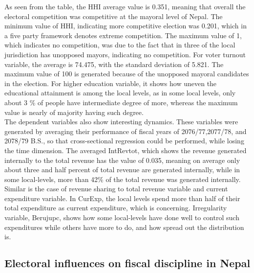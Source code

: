 As seen from the table, the HHI average value is 0.351, meaning that overall the electoral competition was competitive at the mayoral level of Nepal. The minimum value of HHI, indicating more competitive election was 0.201, which in a five party framework denotes extreme competition. The maximum value of 1, which indicates no competition, was due to the fact that in three of the local jurisdiction has unopposed mayors, indicating no competition. For voter turnout variable, the average is 74.475, with the standard deviation of 5.821. The maximum value of 100 is generated because of the unopposed mayoral candidates in the election. For higher education variable, it shows how uneven the educational attainment is among the local levels, as in some local levels, only about 3 \% of people have intermediate degree of more, whereas the maximum value is nearly of majority having such degree.\\
The dependent variables also show interesting dynamics. These variables were generated by averaging their performance of fiscal years of 2076/77,2077/78, and 2078/79 B.S., so that cross-sectional regression could be performed, while losing the time dimension. The averaged IntRevtot, which shows the revenue generated internally to the total revenue has the value of 0.035, meaning on average only about three and half percent of total revenue are generated internally, while in some local-levels, more than 42\% of the total revenue was generated internally. Similar is the case of revenue sharing to total revenue variable and current expenditure variable. In CurExp, the local levels spend more than half of their total expenditure as current expenditure, which is concerning. Irregularity variable, Berujupc, shows how some local-levels have done well to control such expenditures while others have more to do, and how spread out the distribution is.
\subsection{Electoral influences on fiscal discipline in Nepal}
